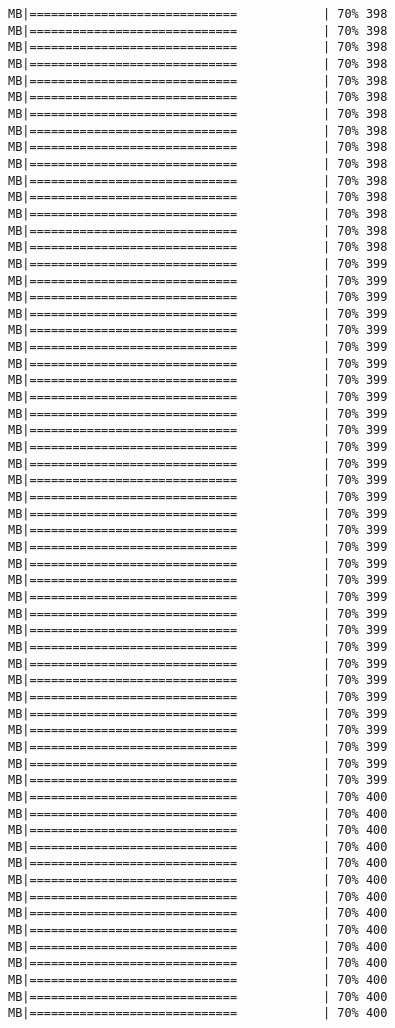 \documentclass[
]{article}
\begin{document}
\begin{verbatim}
MB|=============================            | 70% 398 MB|=============================            | 70% 398 MB|=============================            | 70% 398 MB|=============================            | 70% 398 MB|=============================            | 70% 398 MB|=============================            | 70% 398 MB|=============================            | 70% 398 MB|=============================            | 70% 398 MB|=============================            | 70% 398 MB|=============================            | 70% 398 MB|=============================            | 70% 398 MB|=============================            | 70% 398 MB|=============================            | 70% 398 MB|=============================            | 70% 398 MB|=============================            | 70% 398 MB|=============================            | 70% 399 MB|=============================            | 70% 399 MB|=============================            | 70% 399 MB|=============================            | 70% 399 MB|=============================            | 70% 399 MB|=============================            | 70% 399 MB|=============================            | 70% 399 MB|=============================            | 70% 399 MB|=============================            | 70% 399 MB|=============================            | 70% 399 MB|=============================            | 70% 399 MB|=============================            | 70% 399 MB|=============================            | 70% 399 MB|=============================            | 70% 399 MB|=============================            | 70% 399 MB|=============================            | 70% 399 MB|=============================            | 70% 399 MB|=============================            | 70% 399 MB|=============================            | 70% 399 MB|=============================            | 70% 399 MB|=============================            | 70% 399 MB|=============================            | 70% 399 MB|=============================            | 70% 399 MB|=============================            | 70% 399 MB|=============================            | 70% 399 MB|=============================            | 70% 399 MB|=============================            | 70% 399 MB|=============================            | 70% 399 MB|=============================            | 70% 399 MB|=============================            | 70% 399 MB|=============================            | 70% 399 MB|=============================            | 70% 399 MB|=============================            | 70% 400 MB|=============================            | 70% 400 MB|=============================            | 70% 400 MB|=============================            | 70% 400 MB|=============================            | 70% 400 MB|=============================            | 70% 400 MB|=============================            | 70% 400 MB|=============================            | 70% 400 MB|=============================            | 70% 400 MB|=============================            | 70% 400 MB|=============================            | 70% 400 MB|=============================            | 70% 400 MB|=============================            | 70% 400 MB|=============================            | 70% 400 
\end{verbatim}
\end{document}
